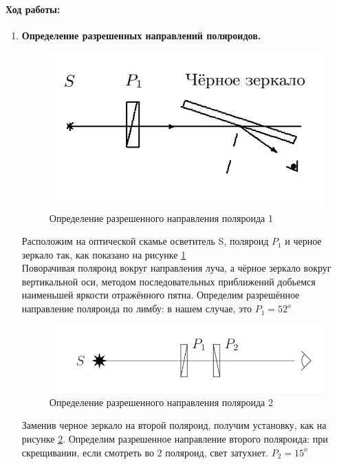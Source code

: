 \documentclass[a4paper,12pt]{article}
\begin{document}
\paragraph{Ход работы:}
\begin{enumerate}
\itemsep0em
\item \textbf{Определение разрешенных направлений поляроидов.} \\
\begin{figure}[h!]
\centering
\includegraphics[scale=0.5]{polar_1.png} 
\caption{Определение разрешенного направления поляроида 1}
\label{polar_1}
\end{figure}
Расположим на оптической скамье осветитель S, поляроид $P_1$ и черное зеркало так, как показано на рисунке \ref{polar_1}\\
Поворачивая поляроид вокруг направления луча, а чёрное зеркало вокруг вертикальной оси, методом последовательных приближений добьемся
наименьшей яркости отражённого пятна. Определим разрешённое направление поляроида по лимбу: в нашем случае, это $P_1=52^o$\\
\begin{figure}[h!]
\centering
\includegraphics[scale=0.5]{polar_2.png} 
\caption{Определение разрешенного направления поляроида 2}
\label{polar_2}
\end{figure}
Заменив черное зеркало на второй поляроид, получим установку, как на рисунке \ref{polar_2}. Определим разрешенное направление второго поляроида: при скрещивании, если смотреть во 2 поляроид, свет затухнет. $P_2 = 15^o$

\end{enumerate}
\end{document}
